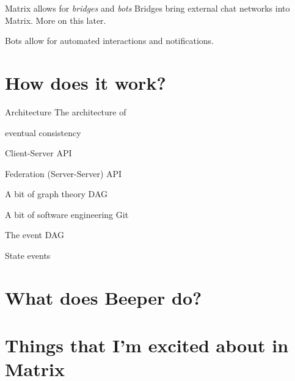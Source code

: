 \documentclass{acm}
\begin{document}
\begin{frame}{Matrix allows for \textit{bridges} and \textit{bots}}
    Bridges bring external chat networks into Matrix. More on this later.
    \pause

    Bots allow for automated interactions and notifications.
\end{frame}

\section{How does it work?}

\begin{frame}{Architecture}
    The architecture of 

    eventual consistency
\end{frame}

\begin{frame}{Client-Server API}

\end{frame}

\begin{frame}{Federation (Server-Server) API}

\end{frame}

\begin{frame}{A bit of graph theory}
    DAG
\end{frame}

\begin{frame}{A bit of software engineering}
    Git
\end{frame}

\begin{frame}{The event DAG}

\end{frame}

\begin{frame}{State events}

\end{frame}

\section{What does Beeper do?}


\section{Things that I'm excited about in Matrix}
\end{document}
